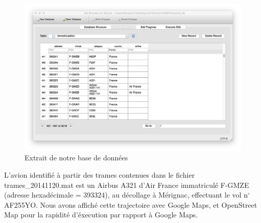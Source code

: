 \documentclass[a4paper, 10pt]{article}
\begin{document}
    \begin{figure}[h!]
    	    \centering
    	    \includegraphics[scale=0.2]{extrait_db.png}
            \caption{Extrait de notre base de données}
    \end{figure}
    
    L'avion identifié à partir des trames contenues dans le fichier \textsf{trames\_20141120.mat} est un Airbus A321 d'Air France immatriculé F-GMZE (adresse hexadécimale = 393324), au décollage à Mérignac, effectuant le vol $\text{n}^{\circ}$ AF255YO.
    Nous avons affiché cette trajectoire avec Google Maps, et OpenStreet Map pour la rapidité d'éxecution par rapport à Google Maps.
    
\end{document}
